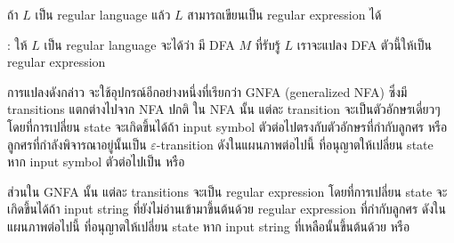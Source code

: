 \begin{lemma}\label{lemma:dfa-regexp}
ถ้า $L$ เป็น regular language แล้ว $L$ สามารถเขียนเป็น regular expression ได้

: ให้ $L$ เป็น regular language \enskip จะได้ว่า มี DFA $M$ ที่รับรู้ $L$ \enskip เราจะแปลง DFA ตัวนี้ให้เป็น regular expression

การแปลงดังกล่าว จะใช้อุปกรณ์อีกอย่างหนึ่งที่เรียกว่า GNFA (generalized NFA) ซึ่งมี transitions แตกต่างไปจาก NFA ปกติ \enskip ใน NFA นั้น แต่ละ transition จะเป็นตัวอักษรเดี่ยวๆ โดยที่การเปลี่ยน state จะเกิดขึ้นได้ถ้า input symbol ตัวต่อไปตรงกับตัวอักษรที่กำกับลูกศร หรือลูกศรที่กำลังพิจารณาอยู่นั้นเป็น $\varepsilon$-transition ดังในแผนภาพต่อไปนี้ ที่อนุญาตให้เปลี่ยน state หาก input symbol ตัวต่อไปเป็น  หรือ 
\begin{center}
\end{center}
ส่วนใน GNFA นั้น แต่ละ transitions จะเป็น regular expression โดยที่การเปลี่ยน state จะเกิดขึ้นได้ถ้า input string ที่ยังไม่อ่านเข้ามาขึ้นต้นด้วย regular expression ที่กำกับลูกศร ดังในแผนภาพต่อไปนี้ ที่อนุญาตให้เปลี่ยน state หาก input string ที่เหลือนั้นขึ้นต้นด้วย  หรือ 
\begin{center}
\end{center}
\end{lemma}

